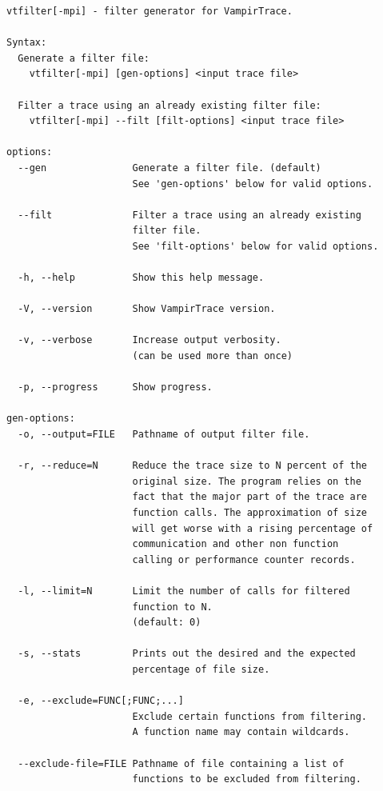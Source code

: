 \documentclass[a4paper,twoside,12pt,BCOR12mm]{scrbook}
\begin{document}
\begin{latexonly}
\latex{\begin{small}}
\begin{verbatim}
vtfilter[-mpi] - filter generator for VampirTrace.

Syntax: 
  Generate a filter file:
    vtfilter[-mpi] [gen-options] <input trace file>

  Filter a trace using an already existing filter file:
    vtfilter[-mpi] --filt [filt-options] <input trace file>  

options:
  --gen               Generate a filter file. (default)
                      See 'gen-options' below for valid options.

  --filt              Filter a trace using an already existing
                      filter file.
                      See 'filt-options' below for valid options.

  -h, --help          Show this help message.

  -V, --version       Show VampirTrace version.

  -v, --verbose       Increase output verbosity.
                      (can be used more than once)

  -p, --progress      Show progress.

gen-options:
  -o, --output=FILE   Pathname of output filter file.

  -r, --reduce=N      Reduce the trace size to N percent of the
                      original size. The program relies on the
                      fact that the major part of the trace are
                      function calls. The approximation of size
                      will get worse with a rising percentage of
                      communication and other non function
                      calling or performance counter records.                           

  -l, --limit=N       Limit the number of calls for filtered
                      function to N.
                      (default: 0)                                         

  -s, --stats         Prints out the desired and the expected
                      percentage of file size.                                     

  -e, --exclude=FUNC[;FUNC;...]
                      Exclude certain functions from filtering.
                      A function name may contain wildcards.   

  --exclude-file=FILE Pathname of file containing a list of
                      functions to be excluded from filtering.                             


\end{verbatim}
\end{latexonly}
\end{document}
